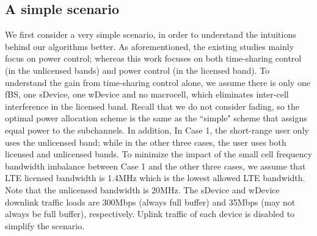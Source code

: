 \documentclass[journal,final,letterpaper,10pt,doublecolumn,twoside]{IEEEtran}
\begin{document}
\subsection{A simple scenario}
We first consider a very simple scenario, in order to understand the intuitions behind our algorithms better.
As aforementioned, the existing studies \cite{femto-PowerControl-2010Sundeep} mainly focus on power control; whereas this work focuses on both time-sharing control (in the unlicensed bands) and power control (in the licensed band). To understand the gain from time-sharing control alone, we assume there is only one fBS, one sDevice, one wDevice and no macrocell, which eliminates inter-cell interference in the licensed band. Recall that we do not consider fading, so the optimal power allocation scheme is the same as the ``simple" scheme that assigns equal power to the subchannels. In addition, In Case 1, the short-range user only uses the unlicensed band; while in the other three cases, the user uses both licensed and unlicensed bands. To minimize the impact of the small cell frequency bandwidth imbalance between Case 1 and the other three cases, we assume that LTE licensed bandwidth is 1.4MHz which is the lowest allowed LTE bandwidth. Note that the unlicensed bandwidth is 20MHz. The sDevice and wDevice downlink traffic loads are 300Mbps (always full buffer) and 35Mbps (may not always be full buffer), respectively. Uplink traffic of each device is disabled to simplify the scenario.
\end{document}
